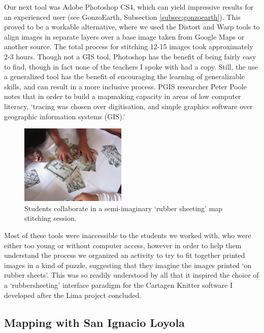 \documentclass[11pt,oneside,notitlepage]{report}
\begin{document}
Our next tool was Adobe Photoshop CS4, which can yield impressive results for an experienced user (see GonzoEarth, Subsection \ref{subsec:gonzoearth}). This proved to be a workable alternative, where we used the Distort and Warp tools to align images in separate layers over a base image taken from Google Maps or another source. The total process for stitching 12-15 images took approximately 2-3 hours. Though not a GIS tool, Photoshop has the benefit of being fairly easy to find, though in fact none of the teachers I spoke with had a copy. Still, the use a generalized tool has the benefit of encouraging the learning of generalizable skills, and can result in a more inclusive process. \ac{PGIS} researcher Peter Poole notes that in order to build a mapmaking capacity in areas of low computer literacy, `tracing was chosen over digitisation, and simple graphics software over geographic information systems (GIS).' \cite{poole2006there}

\begin{figure}
	\begin{flushright}
		\includegraphics[width=0.45\textwidth]{images/juan-pablo-rubbersheeting.jpg}
		\caption{Students collaborate in a semi-imaginary `rubber sheeting' map stitching session.}
	\end{flushright}
\end{figure}

Most of these tools were inaccessible to the students we worked with, who were either too young or without computer access, however in order to help them understand the process we organized an activity to try to fit together printed images in a kind of puzzle, suggesting that they imagine the images printed `on rubber sheets'. This was so readily understood by all that it inspired the choice of a `rubbersheeting' interface paradigm for the Cartagen Knitter software I developed after the Lima project concluded. 

\subsection{Mapping with San Ignacio Loyola}
\end{document}
